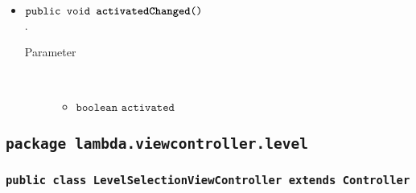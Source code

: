 \begin{description}
\begin{itemize}
		\item $\texttt{public void \textbf{activatedChanged}()}$ \\.
		\begin{description}
			\item[Parameter] \hfill \\
			\vspace{-.8cm}
			\begin{itemize}
				\item $\texttt{boolean activated}$ \\ 
			\end{itemize}
			\end{description}
			

		\end{itemize}
	\end{description}
	
\subsection{\texttt{package lambda.viewcontroller.level}}
	
	\subsubsection{\normalfont \texttt{public class \textbf{LevelSelectionViewController} extends Controller}}

